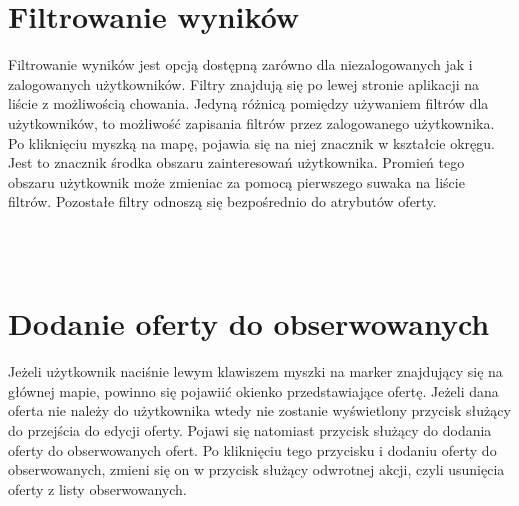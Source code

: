 
\section{Filtrowanie wyników}
Filtrowanie wyników jest opcją dostępną zarówno dla niezalogowanych jak i zalogowanych użytkowników. Filtry znajdują się po lewej stronie aplikacji na liście z możliwością chowania. Jedyną różnicą pomiędzy używaniem filtrów dla użytkowników, to możliwość zapisania filtrów przez zalogowanego użytkownika. Po kliknięciu myszką na mapę, pojawia się na niej znacznik w kształcie okręgu. Jest to znacznik środka obszaru zainteresowań użytkownika. Promień tego obszaru użytkownik może zmieniac za pomocą pierwszego suwaka na liście filtrów. Pozostałe filtry odnoszą się bezpośrednio do atrybutów oferty.\\
\\
\begin{minipage}{\linewidth}
\label{filters}
\end{minipage}\\ 


\section{Dodanie oferty do obserwowanych}
Jeżeli użytkownik naciśnie lewym klawiszem myszki na marker znajdujący się na głównej mapie, powinno się pojawiić okienko przedstawiające ofertę. Jeżeli dana oferta nie należy do użytkownika wtedy nie zostanie wyświetlony przycisk służący do przejścia do edycji oferty. Pojawi się natomiast przycisk służący do dodania oferty do obserwowanych ofert. Po kliknięciu tego przycisku i dodaniu oferty do obserwowanych, zmieni się on w przycisk służący odwrotnej akcji, czyli usunięcia oferty z listy obserwowanych.\\
\\
\begin{minipage}{\linewidth}
\label{watch-offer}
\end{minipage}\\ 
